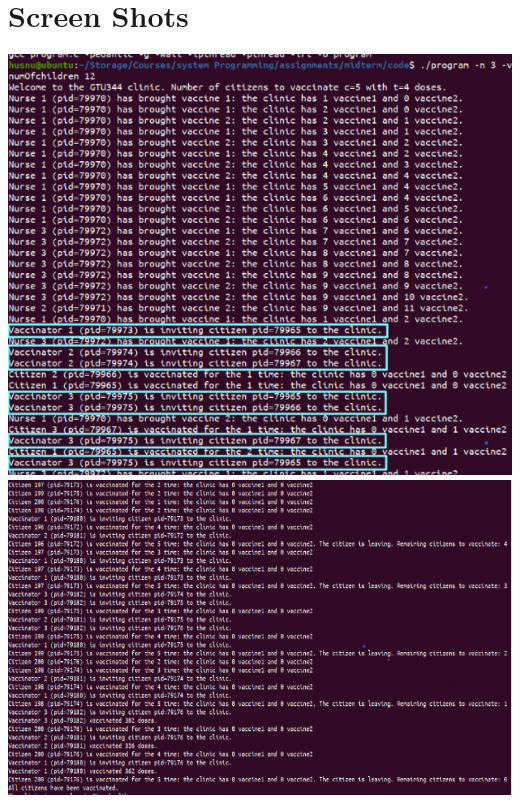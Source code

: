 \documentclass{article}
\begin{document}
\section*{Screen Shots}
\includegraphics[]{start.png}
\includegraphics[]{end.png}
\end{document}
